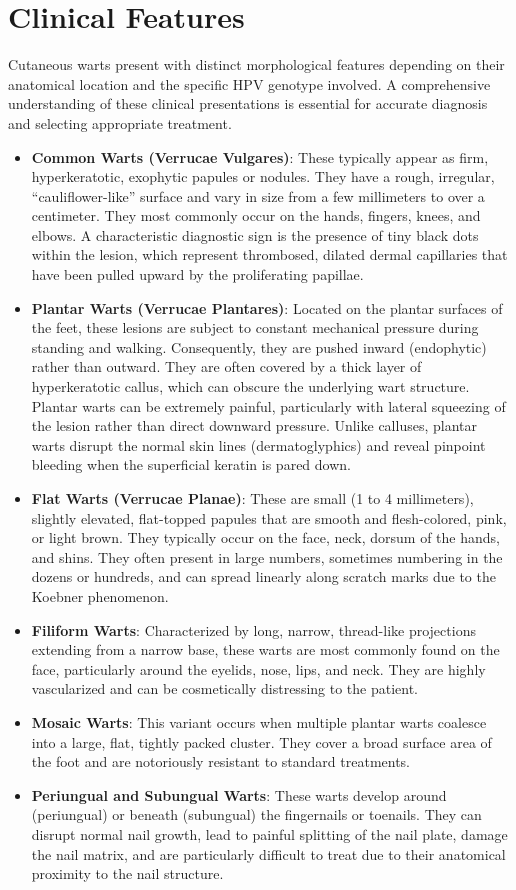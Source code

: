 \section*{Clinical Features}
Cutaneous warts present with distinct morphological features depending on their anatomical location and the specific HPV genotype involved. A comprehensive understanding of these clinical presentations is essential for accurate diagnosis and selecting appropriate treatment.

\begin{itemize}
    \item \textbf{Common Warts (Verrucae Vulgares)}: These typically appear as firm, hyperkeratotic, exophytic papules or nodules. They have a rough, irregular, ``cauliflower-like'' surface and vary in size from a few millimeters to over a centimeter. They most commonly occur on the hands, fingers, knees, and elbows. A characteristic diagnostic sign is the presence of tiny black dots within the lesion, which represent thrombosed, dilated dermal capillaries that have been pulled upward by the proliferating papillae.
    \item \textbf{Plantar Warts (Verrucae Plantares)}: Located on the plantar surfaces of the feet, these lesions are subject to constant mechanical pressure during standing and walking. Consequently, they are pushed inward (endophytic) rather than outward. They are often covered by a thick layer of hyperkeratotic callus, which can obscure the underlying wart structure. Plantar warts can be extremely painful, particularly with lateral squeezing of the lesion rather than direct downward pressure. Unlike calluses, plantar warts disrupt the normal skin lines (dermatoglyphics) and reveal pinpoint bleeding when the superficial keratin is pared down.
    \item \textbf{Flat Warts (Verrucae Planae)}: These are small (1 to 4 millimeters), slightly elevated, flat-topped papules that are smooth and flesh-colored, pink, or light brown. They typically occur on the face, neck, dorsum of the hands, and shins. They often present in large numbers, sometimes numbering in the dozens or hundreds, and can spread linearly along scratch marks due to the Koebner phenomenon.
    \item \textbf{Filiform Warts}: Characterized by long, narrow, thread-like projections extending from a narrow base, these warts are most commonly found on the face, particularly around the eyelids, nose, lips, and neck. They are highly vascularized and can be cosmetically distressing to the patient.
    \item \textbf{Mosaic Warts}: This variant occurs when multiple plantar warts coalesce into a large, flat, tightly packed cluster. They cover a broad surface area of the foot and are notoriously resistant to standard treatments.
    \item \textbf{Periungual and Subungual Warts}: These warts develop around (periungual) or beneath (subungual) the fingernails or toenails. They can disrupt normal nail growth, lead to painful splitting of the nail plate, damage the nail matrix, and are particularly difficult to treat due to their anatomical proximity to the nail structure.
\end{itemize}

